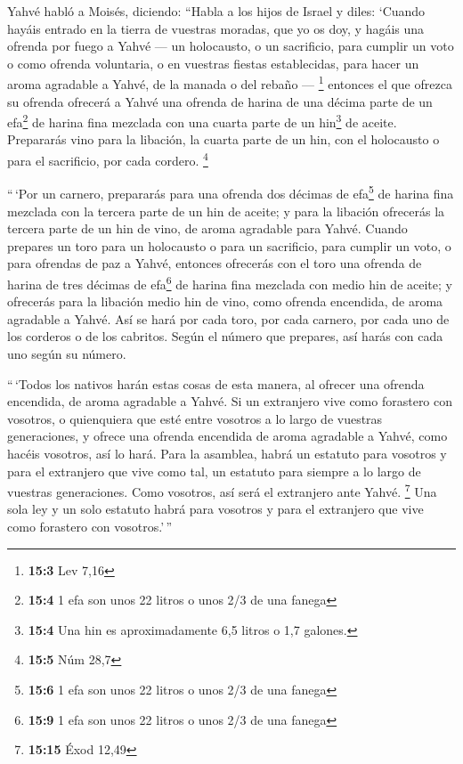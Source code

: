  Yahvé habló a Moisés, diciendo:  ``Habla a
los hijos de Israel y diles: `Cuando hayáis entrado en la tierra de
vuestras moradas, que yo os doy,  y hagáis una ofrenda por
fuego a Yahvé --- un holocausto, o un sacrificio, para cumplir un voto o
como ofrenda voluntaria, o en vuestras fiestas establecidas, para hacer
un aroma agradable a Yahvé, de la manada o del rebaño --- \footnote{\textbf{15:3}
  Lev 7,16}  entonces el que ofrezca su ofrenda ofrecerá a
Yahvé una ofrenda de harina de una décima parte de un efa\footnote{\textbf{15:4}
  1 efa son unos 22 litros o unos 2/3 de una fanega} de harina fina
mezclada con una cuarta parte de un hin\footnote{\textbf{15:4} Una hin
  es aproximadamente 6,5 litros o 1,7 galones.} de aceite.
 Prepararás vino para la libación, la cuarta parte de un
hin, con el holocausto o para el sacrificio, por cada cordero.
\footnote{\textbf{15:5} Núm 28,7}

 ``\,`Por un carnero, prepararás para una ofrenda dos
décimas de efa\footnote{\textbf{15:6} 1 efa son unos 22 litros o unos
  2/3 de una fanega} de harina fina mezclada con la tercera parte de un
hin de aceite;  y para la libación ofrecerás la tercera
parte de un hin de vino, de aroma agradable para Yahvé. 
Cuando prepares un toro para un holocausto o para un sacrificio, para
cumplir un voto, o para ofrendas de paz a Yahvé,  entonces
ofrecerás con el toro una ofrenda de harina de tres décimas de
efa\footnote{\textbf{15:9} 1 efa son unos 22 litros o unos 2/3 de una
  fanega} de harina fina mezclada con medio hin de aceite;
 y ofrecerás para la libación medio hin de vino, como
ofrenda encendida, de aroma agradable a Yahvé.  Así se
hará por cada toro, por cada carnero, por cada uno de los corderos o de
los cabritos.  Según el número que prepares, así harás
con cada uno según su número.

 ``\,`Todos los nativos harán estas cosas de esta manera,
al ofrecer una ofrenda encendida, de aroma agradable a Yahvé.
 Si un extranjero vive como forastero con vosotros, o
quienquiera que esté entre vosotros a lo largo de vuestras generaciones,
y ofrece una ofrenda encendida de aroma agradable a Yahvé, como hacéis
vosotros, así lo hará.  Para la asamblea, habrá un
estatuto para vosotros y para el extranjero que vive como tal, un
estatuto para siempre a lo largo de vuestras generaciones. Como
vosotros, así será el extranjero ante Yahvé. \footnote{\textbf{15:15}
  Éxod 12,49}  Una sola ley y un solo estatuto habrá para
vosotros y para el extranjero que vive como forastero con vosotros.'\,''

